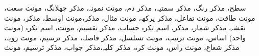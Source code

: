 سطح، مذکر
رنگ، مذکر
سمتیہ، مذکر
دم، مونث
نمونہ، مذکر
چھلانگ، مونث
سعت، مونث
طاقت، مونث
تفاعل، مذکر
پرکھ، مونث
مثال، مذکر،مونث
اوسط، مذکر، مونث
نقشہ، مذکر
شمار، مذکر، اسم نکرہ
حساب، مذکر
تقسیم، مونث، اسم نکرہ (مونث واحد)
اساس، مونث
ترتیب، مونث
تسلسل، مذکر
فاصلہ، مذکر
ترسیم، مونث
زویہ، مذکر
شعاع، مونث
راس، مونث
کرہ، مذکر
کلیہ،مذکر
جواب، مذکر
ترسیم، مونث

